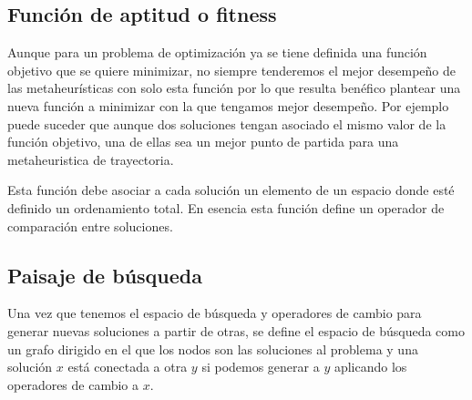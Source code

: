 \subsection{Función de aptitud o fitness}
Aunque para un problema de optimización ya se tiene definida una función objetivo que se quiere minimizar, no siempre tenderemos el mejor desempeño de las metaheurísticas con solo esta función por lo que resulta benéfico plantear una nueva función a minimizar con la que tengamos mejor desempeño. Por ejemplo puede suceder que aunque dos soluciones tengan asociado el mismo valor de la función objetivo, una de ellas sea un mejor punto de partida para una metaheuristica de trayectoria.

Esta función debe asociar a cada solución un elemento de un espacio donde esté definido un ordenamiento total. En esencia esta función define un operador de comparación entre soluciones.
\subsection{Paisaje de búsqueda}
Una vez que tenemos el espacio de búsqueda y operadores de cambio para generar nuevas soluciones a partir de otras, se define el espacio de búsqueda como un grafo dirigido en el que los nodos son las soluciones al problema y una solución $x$ está conectada a otra $y$ si podemos generar a $y$ aplicando los operadores de cambio a $x$.\\

